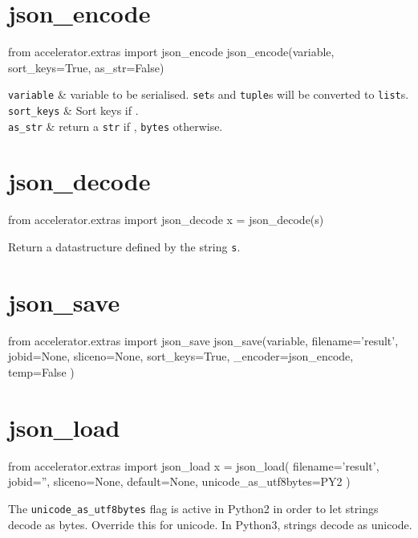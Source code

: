 \section{json\_encode}
\begin{python}
from accelerator.extras import json_encode
json_encode(variable, sort_keys=True, as_str=False)
\end{python}

\starttabletwo
\RPtwo \texttt{variable} & variable to be serialised.  \texttt{set}s and
\texttt{tuple}s will be converted to \texttt{list}s.\\[1ex]

\RPtwo \texttt{sort\_keys} & Sort keys if \pyTrue.\\[1ex]

\RPtwo \texttt{as\_str} & return a \texttt{str} if \pyTrue, \texttt{bytes}
otherwise.
\stoptabletwo



\section{json\_decode}
\begin{python}
from accelerator.extras import json_decode
x = json_decode(s)
\end{python}
Return a datastructure defined by the string \texttt{s}.




\section{json\_save}
\begin{python}
from accelerator.extras import json_save
json_save(variable,
    filename='result',
    jobid=None,
    sliceno=None,
    sort_keys=True,
    _encoder=json_encode,
    temp=False
)
\end{python}




\section{json\_load}
\begin{python}
from accelerator.extras import json_load
x = json_load(
    filename='result',
    jobid='',
    sliceno=None,
    default=None,
    unicode_as_utf8bytes=PY2
)
\end{python}
The \texttt{unicode\_as\_utf8bytes} flag is active in Python2 in order
to let strings decode as bytes.  Override this for unicode.  In
Python3, strings decode as unicode.





